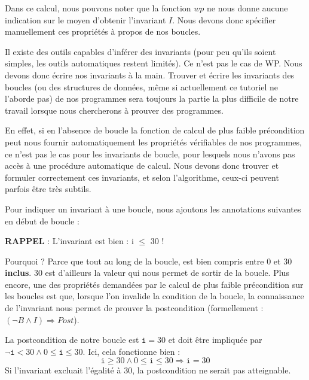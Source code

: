 Dans ce calcul, nous pouvons noter que la fonction $wp$ ne nous donne aucune
indication sur le moyen d'obtenir l'invariant $I$. Nous devons donc
spécifier manuellement ces propriétés à propos de nos boucles.





Il existe des outils capables d'inférer des invariants (pour peu qu'ils soient
simples, les outils automatiques restent limités). Ce n'est pas le cas de WP.
Nous devons donc écrire nos invariants à la main. Trouver et écrire les
invariants des boucles (ou des structures de données, même si actuellement ce
tutoriel ne l'aborde pas) de nos programmes sera toujours la partie la plus
difficile de notre travail lorsque nous chercherons à prouver des programmes.



En effet, si en l'absence de boucle la fonction de calcul de plus faible
précondition peut nous fournir automatiquement les propriétés vérifiables de nos
programmes, ce n'est pas le cas pour les invariants de boucle, pour lesquels
nous n'avons pas accès à une procédure automatique de calcul. Nous devons donc
trouver et formuler correctement ces invariants, et selon l'algorithme, ceux-ci
peuvent parfois être très subtils.



Pour indiquer un invariant à une boucle, nous ajoutons les annotations suivantes
en début de boucle :






\begin{Warning}
\textbf{RAPPEL} : L'invariant est bien : i \textbf{$\leq$} 30 !
\end{Warning}


Pourquoi ? Parce que tout au long de la boucle,  est bien compris entre
0 et 30 \textbf{inclus}. 30 est d'ailleurs la valeur qui nous permet de sortir de la
boucle. Plus encore, une des propriétés demandées par le calcul de plus faible
précondition sur les boucles est que, lorsque l'on invalide la condition de la
boucle, la connaissance de l'invariant nous permet de prouver la postcondition
(formellement : $(\neg B \wedge I) \Rightarrow Post$).



La postcondition de notre boucle est $\texttt{i} = 30$ et doit être impliquée par
$\neg \texttt{i} < 30 \wedge 0 \leq \texttt{i} \leq 30$. Ici, cela fonctionne
bien :
$$\texttt{i} \geq 30 \wedge 0 \leq \texttt{i} \leq 30 \Rightarrow \texttt{i} = 30$$
Si l'invariant excluait l'égalité à 30, la postcondition ne serait pas atteignable.



